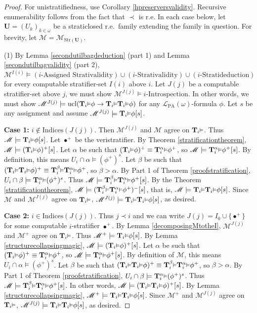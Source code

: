 \documentclass[reqno]{article}
\theoremstyle{definition}
\def\L{\mathscr{L}}
\def\M{\mathscr{M}}
\def\T{\mathbf{T}}
\def\U{\mathbf{U}}
\def\indices{\mathrm{Indices}}
\def\LPA{\L_{\mathrm{PA}}}
\renewcommand{\Pr}[1]{\T_{#1}\mbox{\small${\vDash}$}}
\newcommand{\Prr}[2]{\T^{#1}_{#2}\mbox{\small${\vDash}$}}
\newcommand{\ucl}[1]{\mathrm{ucl}(#1)}
\newcommand{\case}[1]{\textbf{Case #1:}}
\newcommand{\str}[1]{\mathrm{Str}(#1)} \newcommand{\Str}[1]{\str{#1}}
\begin{document}
\begin{proof}
For unistratifiedness, use Corollary \ref{hpreserversvalidity}.
Recursive enumerability follows from the fact that $\prec$ is r.e.
In each case below, let $\U=(U_k)_{k\in\omega}$ be a straticlosed r.e.~family
extending the family in question. For brevity, let $\M=\M_{\str\U}$.

\item
(1)
By Lemma \ref{secondutilbagdeduction} (part 1)
and Lemma \ref{secondutilbagvalidity} (part 2),
$\M^{I(i)}\models(\mbox{$i$-Assigned Strativalidity})
\cup (\mbox{$i$-Strativalidity})
\cup (\mbox{$i$-Stratideduction})$
for every computable stratifier-set
$I(i)$ above $i$.
Let $J(j)$ be a computable stratifier-set above $j$, we must show
$\M^{J(j)}\models \mbox{$i$-Introspection}$.
In other words, we must show $\M^{J(j)}\models \ucl{\Pr i\phi\rightarrow \Pr i\Pr i\phi}$
for any $\LPA(\omega)$-formula $\phi$.
Let $s$ be any assignment and assume $\M^{J(j)}\models \Pr i\phi[s]$.

\item
\case1
$i\not\in\indices(J(j))$.
Then $\M^{J(j)}$ and $\M$ agree on $\Pr i$.
Thus $\M\models \Pr i\phi[s]$.
Let $\bullet^+$ be the veristratifier.
By Theorem \ref{stratificationtheorem},
$\M\models (\Pr i\phi)^+[s]$.
Let $\alpha$ be such that $(\Pr i\phi)^+\equiv \Prr\alpha i\phi^+$,
so $\M\models\Prr\alpha i\phi^+[s]$.
By definition, this means $U_i\cap\alpha\models (\phi^+)^s$.
Let $\beta$ be such that $(\Pr i\Pr i\phi)^+\equiv \Prr\beta i \Prr\alpha i\phi^+$,
so $\beta>\alpha$.
By Part 1 of Theorem \ref{proofstratification},
$U_i\cap\beta\models\Prr\alpha i (\phi^+)^s$.
Thus $\M\models \Prr\beta i\Prr\alpha i \phi^+[s]$.
By the Theorem \ref{stratificationtheorem},
$\M\models (\Prr\beta i\Prr\alpha i\phi^+)^-[s]$, that is,
$\M\models \Pr i\Pr i\phi[s]$. Since $\M$ and $\M^{J(j)}$ agree on $\Pr i$,
$\M^{J(j)}\models \Pr i\Pr i\phi[s]$, as desired.

\item
\case2
$i\in\indices(J(j))$.
Thus $j\prec i$ and we can write $J(j)=I_0\cup\{\bullet^+\}$
for some computable $i$-stratifier $\bullet^+$.
By Lemma \ref{decomposingMtotheI}, $\M^{J(j)}$ and
$\M^+$ agree on $\Pr i$.
Thus $\M^+\models \Pr i\phi[s]$.
By Lemma \ref{structurecollapsingmagic},
$\M\models (\Pr i\phi)^+[s]$.
Let $\alpha$ be such that $(\Pr i\phi)^+\equiv \Prr\alpha i\phi^+$,
so $\M\models\Prr\alpha i\phi^+[s]$.
By definition of $\M$, this means
$U_i\cap\alpha\models(\phi^+)^s$.
Let $\beta$ be such that $(\Pr i \Pr i\phi)^+\equiv \Prr\beta i\Prr\alpha i\phi^+$,
so $\beta>\alpha$.
By Part 1 of Theorem \ref{proofstratification},
$U_i\cap\beta\models\Prr\alpha i(\phi^+)^s$.
Thus $\M\models\Prr\beta i\Prr\alpha i\phi^+[s]$.
In other words, $\M\models (\Pr i\Pr i\phi)^+[s]$.
By Lemma \ref{structurecollapsingmagic},
$\M^+\models \Pr i\Pr i\phi[s]$.
Since $\M^+$ and $\M^{J(j)}$ agree on $\Pr i$,
$\M^{J(j)}\models \Pr i\Pr i\phi[s]$, as desired.


\end{proof}
\end{document}

